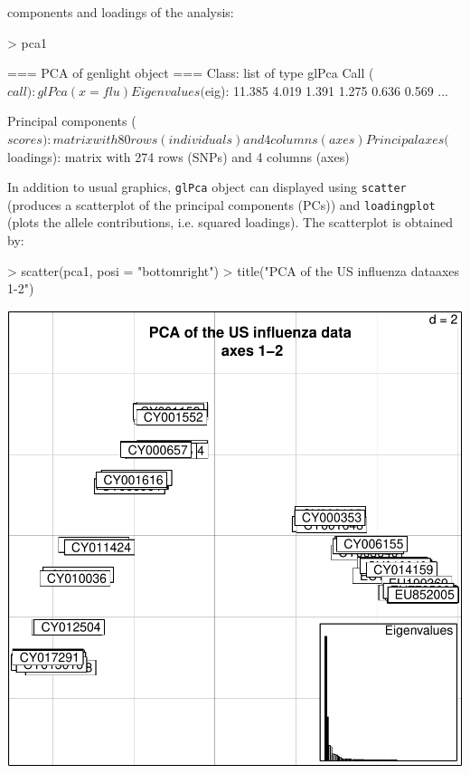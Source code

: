 \documentclass{article}
\begin{document}
components and loadings of the analysis:
\begin{Schunk}
\begin{Sinput}
> pca1
\end{Sinput}
\begin{Soutput}
 === PCA of genlight object ===
Class: list of type glPca
Call ($call):glPca(x = flu)

Eigenvalues ($eig):
 11.385 4.019 1.391 1.275 0.636 0.569 ...

Principal components ($scores):
 matrix with 80 rows (individuals) and 4 columns (axes) 

Principal axes ($loadings):
 matrix with 274 rows (SNPs) and 4 columns (axes) 
\end{Soutput}
\end{Schunk}

In addition to usual graphics, \texttt{glPca} object can displayed using \texttt{scatter} (produces
a scatterplot of the principal components (PCs)) and \texttt{loadingplot} (plots the allele contributions,
i.e. squared loadings).
The scatterplot is obtained by:
\begin{Schunk}
\begin{Sinput}
> scatter(pca1, posi = "bottomright")
> title("PCA of the US influenza data\n axes 1-2")
\end{Sinput}
\end{Schunk}
\includegraphics{figs/genomics-053}
\end{document}
